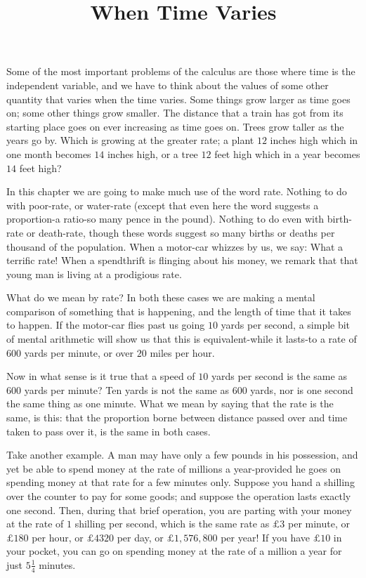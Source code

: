 \documentclass{ximera}
\title{When Time Varies}
\begin{document}
\begin{abstract}
\end{abstract}
\maketitle

Some of the most important problems of the calculus
are those where time is the independent variable, and
we have to think about the values of some other
quantity that varies when the time varies. Some
things grow larger as time goes on; some other things
grow smaller. The distance that a train has got from
its starting place goes on ever increasing as time goes
on. Trees grow taller as the years go by. Which is
growing at the greater rate; a plant $12$ inches high
which in one month becomes $14$ inches high, or a
tree $12$ feet high which in a year becomes $14$ feet
high?

In this chapter we are going to make much use
of the word rate. Nothing to do with poor-rate, or
water-rate (except that even here the word suggests
a proportion-a ratio-so many pence in the pound).
Nothing to do even with birth-rate or death-rate,
though these words suggest so many births or deaths
per thousand of the population. When a motor-car
whizzes by us, we say: What a terrific rate! When
a spendthrift is flinging about his money, we remark
that that young man is living at a prodigious rate.

What do we mean by rate? In both these cases we
are making a mental comparison of something that is
happening, and the length of time that it takes to
happen. If the motor-car flies past us going $10$ yards
per second, a simple bit of mental arithmetic will
show us that this is equivalent-while it lasts-to a
rate of $600$ yards per minute, or over $20$ miles per
hour.

Now in what sense is it true that a speed of
$10$ yards per second is the same as $600$ yards
per minute? Ten yards is not the same as $600$ yards,
nor is one second the same thing as one minute.
What we mean by saying that the rate is the same,
is this: that the proportion borne between distance
passed over and time taken to pass over it, is the
same in both cases.

Take another example. A man may have only
a few pounds in his possession, and yet be able to
spend money at the rate of millions a year-provided
he goes on spending money at that rate for a few
minutes only. Suppose you hand a shilling over
the counter to pay for some goods; and suppose the
operation lasts exactly one second. Then, during
that brief operation, you are parting with your money
at the rate of $1$ shilling per second, which is the
same rate as $\pounds$$3$ per minute, or $\pounds$$180$ per hour, or
$\pounds$$4320$ per day, or $\pounds$$1,576,800$ per year! If you have
$\pounds$$10$ in your pocket, you can go on spending money
at the rate of a million a year for just $5\frac{1}{4}$ minutes.
\end{document}
